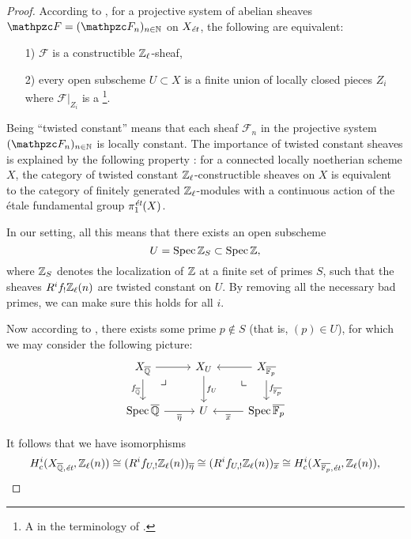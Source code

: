 \begin{proposition}
\begin{proof}
    According to \cite[Exposé VI, 1.2.6]{SGA5}, for a projective system of
    abelian sheaves $\mathcal{F} = (\mathcal{F}_n)_{n\in\NN}$ on
    $X_\text{\it ét}$, the following are equivalent:

    \begin{enumerate}
    \item[1)] $\mathcal{F}$ is a constructible $\mathbb{Z}_\ell$-sheaf,

    \item[2)] every open subscheme $U\subset X$ is a finite union of locally
      closed pieces $Z_i$ where $\left.\mathcal{F}\right|_{Z_i}$ is a
      \footnote{A
         in the terminology of \cite[Rapport]{SGA4-1-2}.}.
    \end{enumerate}

    Being ``twisted constant'' means that each sheaf $\mathcal{F}_n$ in the
    projective system $(\mathcal{F}_n)_{n\in\NN}$ is locally constant.
    The importance of twisted constant sheaves is explained by the following
    property \cite[Exposé VI, 1.2.4, 1.2.5]{SGA5}: for a connected locally
    noetherian scheme $X$, the category of twisted constant
    $\mathbb{Z}_\ell$-constructible sheaves on $X$ is equivalent to the category of
    finitely generated $\mathbb{Z}_\ell$-modules with a continuous action of the étale
    fundamental group $\pi_1^\text{\it ét} (X)$.

    In our setting, all this means that there exists an open subscheme
    $$U = \operatorname{Spec} \mathbb{Z}_S \subset \operatorname{Spec} \mathbb{Z},$$
    where $\mathbb{Z}_S$ denotes the localization of $\mathbb{Z}$ at a finite set of primes
    $S$, such that the sheaves $R^i f_! \mathbb{Z}_\ell (n)$ are twisted constant on
    $U$.  By removing all the necessary bad primes, we can make sure this holds
    for all $i$.

    Now according to \cite[Book IX, Proposition 20]{Elements}, there exists some
    prime $p \notin S$ (that is, $(p) \in U$), for which we may consider the
    following picture:
    \[ \begin{tikzcd}
        X_{\overline{\QQ}} \ar{r}\tikzpb\ar{d}[swap]{f_{\overline{\QQ}}} & X_U \ar{d}{f_U} & X_{\overline{\FF_p}} \ar{l}\ar{d}{f_{\overline{\FF_p}}}\tikzpbur \\
        \Spec \overline{\QQ} \ar{r}[swap]{\overline{\eta}} & U & \Spec \overline{\FF_p} \ar{l}{\overline{x}}
      \end{tikzcd} \]

    It follows that we have isomorphisms
    \begin{equation}
      \label{eqn:iso-pbc-Zl-Gal(QS/Q)}
      H^i_c (X_{\overline{\mathbb{Q}}, \text{\it ét}}, \mathbb{Z}_\ell (n)) \cong
      (R^i f_{U,!} \mathbb{Z}_\ell (n))_{\overline{\eta}} \cong
      (R^i f_{U,!} \mathbb{Z}_\ell (n))_{\overline{x}} \cong
      H^i_c (X_{\overline{\mathbb{F}_p}, \text{\it ét}}, \mathbb{Z}_\ell (n)),
    \end{equation}


\end{proof}
\end{proposition}
